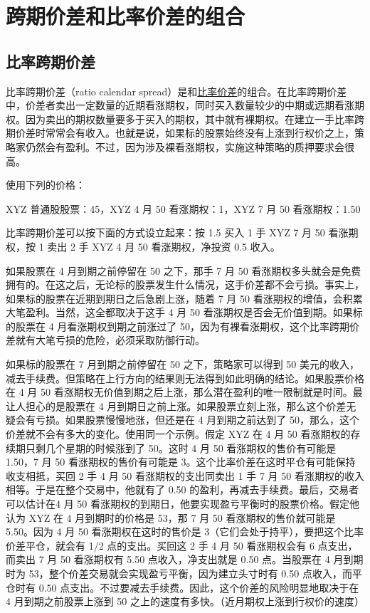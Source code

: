 \chapter{跨期价差和比率价差的组合}
\section{比率跨期价差}
比率跨期价差（ratio calendar spread）是和\href{CH:ratio call spreads}{比率价差}的组合。在比率跨期价差中，价差者卖出一定数量的近期看涨期权，同时买入数量较少的中期或远期看涨期权。因为卖出的期权数量要多于买入的期权，其中就有裸期权。在建立一手比率跨期价差时常常会有收入。也就是说，如果标的股票始终没有上涨到行权价之上，策略家仍然会有盈利。不过，因为涉及裸看涨期权，实施这种策略的质押要求会很高。

使用下列的价格：
\begin{tcolorbox}
    XYZ 普通股股票：45，XYZ 4 月 50 看涨期权：1，XYZ 7 月 50 看涨期权：1.50
\end{tcolorbox}

比率跨期价差可以按下面的方式设立起来：按 1.5 买入 1 手 XYZ 7 月 50 看涨期权，按 1 卖出 2 手 XYZ 4 月 50 看涨期权，净投资 0.5 收入。

如果股票在 4 月到期之前停留在 50 之下，那手 7 月 50 看涨期权多头就会是免费拥有的。在这之后，无论标的股票发生什么情况，这手价差都不会亏损。事实上，如果标的股票在近期到期日之后急剧上涨，随着 7 月 50 看涨期权的增值，会积累大笔盈利。当然，这全都取决于这手 4 月 50 看涨期权是否会无价值到期。如果标的股票在 4 月看涨期权到期之前涨过了 50，因为有裸看涨期权，这个比率跨期价差就有大笔亏损的危险，必须采取防御行动。

如果标的股票在 7 月到期之前停留在 50 之下，策略家可以得到 50 美元的收入，减去手续费。但策略在上行方向的结果则无法得到如此明确的结论。如果股票价格在 4 月 50 看涨期权无价值到期之后上涨，那么潜在盈利的唯一限制就是时间。最让人担心的是股票在 4 月到期日之前上涨。如果股票立刻上涨，那么这个价差无疑会有亏损。如果股票慢慢地涨，但还是在 4 月到期之前达到了 50，那么，这个价差就不会有多大的变化。使用同一个示例。假定 XYZ 在 4 月 50 看涨期权的存续期只剩几个星期的时候涨到了 50。这时 4 月 50 看涨期权的售价有可能是 1.50，7 月 50 看涨期权的售价有可能是 3。这个比率价差在这时平仓有可能保持收支相抵，买回 2 手 4 月 50 看涨期权的支出同卖出 1 手 7 月 50 看涨期权的收入相等。于是在整个交易中，他就有了 0.50 的盈利，再减去手续费。最后，交易者可以估计在4 月 50 看涨期权的到期日，他要实现盈亏平衡时的股票价格。假定他认为 XYZ 在 4 月到期时的价格是 53，那 7 月 50 看涨期权的售价就可能是 5.50。因为 4 月 50 看涨期权在这时的售价是 3（它们会处于持平），要把这个比率价差平仓，就会有 1/2 点的支出。买回这 2 手 4 月 50 看涨期权会有 6 点支出，而卖出 7 月 50 看涨期权有 5.50 点收入，净支出就是 0.50 点。当股票在 4 月到期时为 53，整个价差交易就会实现盈亏平衡，因为建立头寸时有 0.50 点收入，而平仓时有 0.50 点支出。不过要减去手续费。因此，这个价差的风险明显地取决于在 4 月到期之前股票上涨到 50 之上的速度有多快。（近月期权上涨到行权价的速度）

